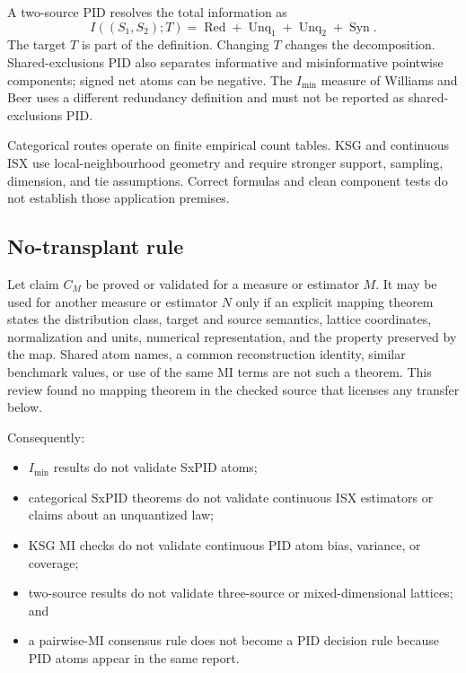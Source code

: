 \documentclass[11pt]{article}
\newcommand{\Imin}{I_{\min}}
\begin{document}
A two-source PID resolves the total information as
\begin{equation}\label{eq:pididentity}
 I((S_1,S_2);T)=\operatorname{Red}+\operatorname{Unq}_1+
 \operatorname{Unq}_2+\operatorname{Syn}.
\end{equation}
The target $T$ is part of the definition.  Changing $T$ changes the
decomposition.  Shared-exclusions PID also separates informative and
misinformative pointwise components; signed net atoms can be negative.
The $\Imin$ measure of Williams and Beer uses a different redundancy definition
and must not be reported as shared-exclusions PID\@.

Categorical routes operate on finite empirical count tables.  KSG and continuous
ISX use local-neighbourhood geometry and require stronger support, sampling,
dimension, and tie assumptions.  Correct formulas and clean component tests do
not establish those application premises.

\subsection{No-transplant rule}

Let claim $C_M$ be proved or validated for a measure or estimator $M$.  It may
be used for another measure or estimator $N$ only if an explicit mapping theorem
states the distribution class, target and source semantics, lattice coordinates,
normalization and units, numerical representation, and the property preserved by
the map.  Shared atom names, a common reconstruction identity, similar benchmark
values, or use of the same MI terms are not such a theorem.
This review found no mapping theorem in the checked source that licenses any
transfer below.

Consequently:
\begin{itemize}
\item $\Imin$ results do not validate SxPID atoms;
\item categorical SxPID theorems do not validate continuous ISX estimators or claims about an unquantized law;
\item KSG MI checks do not validate continuous PID atom bias, variance, or coverage;
\item two-source results do not validate three-source or mixed-dimensional lattices; and
\item a pairwise-MI consensus rule does not become a PID decision rule because PID atoms appear in the same report.
\end{itemize}
\end{document}
